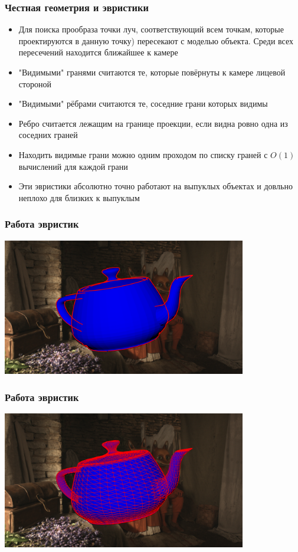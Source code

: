 \begin{frame}\frametitle{Честная геометрия и эвристики}
\begin{itemize}
	\item Для поиска прообраза точки луч, соответствующий всем точкам, которые проектируются в данную точку) пересекают с моделью объекта. Среди всех пересечений находится ближайшее к камере
        \pause
        \item "Видимыми" гранями считаются те, которые повёрнуты к камере лицевой стороной
        \pause
        \item "Видимыми" рёбрами считаются те, соседние грани которых видимы
        \pause
        \item Ребро считается лежащим на границе проекции, если видна ровно одна из соседних граней
        \pause
        \item Находить видимые грани можно одним проходом по списку граней с $O(1)$ вычислений для каждой грани
        \item Эти эвристики абсолютно точно работают на выпуклых объектах и довльно неплохо для близких к выпуклым
    \end{itemize}
\end{frame}

\begin{frame}\frametitle{Работа эвристик}
    \begin{center}
        \includegraphics[height=6cm]{lobanov_imgs/border.png}
    \end{center}
\end{frame}

\begin{frame}\frametitle{Работа эвристик}
    \begin{center}
        \includegraphics[height=6cm]{lobanov_imgs/visible_edges.png}
    \end{center}
\end{frame}

